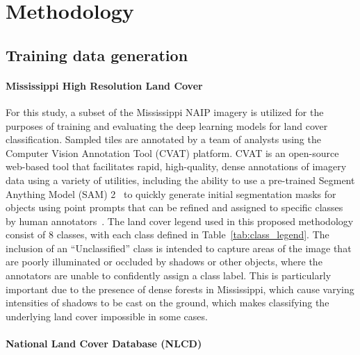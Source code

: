 \section{Methodology}\label{sec:methodology}

\subsection{Training data generation}

\paragraph{Mississippi High Resolution Land Cover}

For this study, a subset of the Mississippi NAIP imagery is utilized for the purposes of training and evaluating the deep learning models for land cover classification.
Sampled tiles are annotated by a team of analysts using the Computer Vision Annotation Tool (CVAT) platform.
CVAT is an open-source web-based tool that facilitates rapid, high-quality, dense annotations of imagery data using a variety of utilities, including the ability to use a pre-trained Segment Anything Model (SAM) 2~\cite{raviSAM2Segment2024} to quickly generate initial segmentation masks for objects using point prompts that can be refined and assigned to specific classes by human annotators~\cite{cvat2023}.
The land cover legend used in this proposed methodology consist of 8 classes, with each class defined in Table~\ref{tab:class_legend}.
The inclusion of an ``Unclassified'' class is intended to capture areas of the image that are poorly illuminated or occluded by shadows or other objects, where the annotators are unable to confidently assign a class label.
This is particularly important due to the presence of dense forests in Mississippi, which cause varying intensities of shadows to be cast on the ground, which makes classifying the underlying land cover impossible in some cases.



\paragraph{National Land Cover Database (NLCD)}

